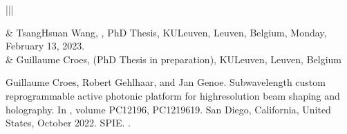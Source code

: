 \documentclass[a4paper,10pt,english,openany,oneside]{jupyterBook}
\begin{document}
\begin{savenotes}\sphinxattablestart
\centering
{}
\sphinxthecaptionisattop
{}\label{\detokenize{Publications:id3}}
\sphinxaftertopcaption
\begin{tabular}[t]{|||}
\hline

\sphinxAtStartPar
{}
&
\sphinxAtStartPar
Tsang\sphinxhyphen{}Hsuan Wang,
,
PhD Thesis, KULeuven, Leuven, Belgium, Monday, February 13, 2023.
\\
\hline
\sphinxAtStartPar
{}
&
\sphinxAtStartPar
Guillaume Croes, (PhD Thesis in preparation), KULeuven, Leuven, Belgium
\\
\hline
\end{tabular}
\par
\sphinxattableend\end{savenotes}

\sphinxstepscope

\begin{sphinxthebibliography}{1}
\sphinxAtStartPar
Guillaume Croes, Robert Gehlhaar, and Jan Genoe. Sub\sphinxhyphen{}wavelength custom reprogrammable active photonic platform for high\sphinxhyphen{}resolution beam shaping and holography. In , volume PC12196, PC1219619. San Diego, California, United States, October 2022. SPIE. .
\end{sphinxthebibliography}







\renewcommand{\indexname}{Index}
\printindex
\end{document}
